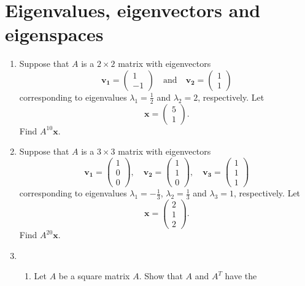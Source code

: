 \documentclass[english,12pt,a4paper]{scrartcl}
\renewcommand{\vec}[1]{\bm{#1}}
\begin{document}
\section*{Eigenvalues, eigenvectors and eigenspaces}
\begin{enumerate}[start=6]
  \item %
    Suppose that $A$ is a $2 \times 2$ matrix with eigenvectors
    \[
      \vec{v_1} =
      \begin{pmatrix}
        1 \\ -1
      \end{pmatrix}
      \quad \text{and} \quad
      \vec{v_2} =
      \begin{pmatrix}
        1 \\ 1
      \end{pmatrix}
    \]
    corresponding to eigenvalues $\lambda_1 = \frac{1}{2}$ and $\lambda_2 = 2$, 
    respectively. Let
    \[
      \vec{x} =
      \begin{pmatrix}
        5 \\ 1
      \end{pmatrix}.
    \]
    Find $A^{10}\vec{x}$.
  \item %
    Suppose that $A$ is a $3 \times 3$ matrix with eigenvectors
    \[
      \vec{v_1} =
      \begin{pmatrix}
        1 \\ 0 \\ 0
      \end{pmatrix}
      ,
      \quad
      \vec{v_2} =
      \begin{pmatrix}
        1 \\ 1 \\ 0
      \end{pmatrix}
      ,
      \quad
      \vec{v_3} =
      \begin{pmatrix}
        1 \\ 1 \\ 1
      \end{pmatrix}
    \]
    corresponding to eigenvalues $\lambda_1 = -\frac{1}{3}$, $\lambda_2 = 
    \frac{1}{3}$ and $\lambda_3 = 1$, respectively. Let
    \[
      \vec{x} =
      \begin{pmatrix}
        2 \\ 1 \\ 2
      \end{pmatrix}.
    \]
    Find $A^{20}\vec{x}$.
  \item %
    \begin{enumerate}
      \item Let $A$ be a square matrix $A$. Show that $A$ and $A^T$ have the 

\end{enumerate}
\end{enumerate}
\end{document}
